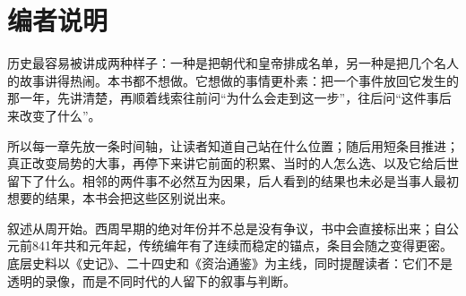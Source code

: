 \chapter*{编者说明}

历史最容易被讲成两种样子：一种是把朝代和皇帝排成名单，另一种是把几个名人的故事讲得热闹。本书都不想做。它想做的事情更朴素：把一个事件放回它发生的那一年，先讲清楚，再顺着线索往前问“为什么会走到这一步”，往后问“这件事后来改变了什么”。

所以每一章先放一条时间轴，让读者知道自己站在什么位置；随后用短条目推进；真正改变局势的大事，再停下来讲它前面的积累、当时的人怎么选、以及它给后世留下了什么。相邻的两件事不必然互为因果，后人看到的结果也未必是当事人最初想要的结果，本书会把这些区别说出来。

叙述从周开始。西周早期的绝对年份并不总是没有争议，书中会直接标出来；自公元前841年共和元年起，传统编年有了连续而稳定的锚点，条目会随之变得更密。底层史料以《史记》、二十四史和《资治通鉴》为主线，同时提醒读者：它们不是透明的录像，而是不同时代的人留下的叙事与判断。
